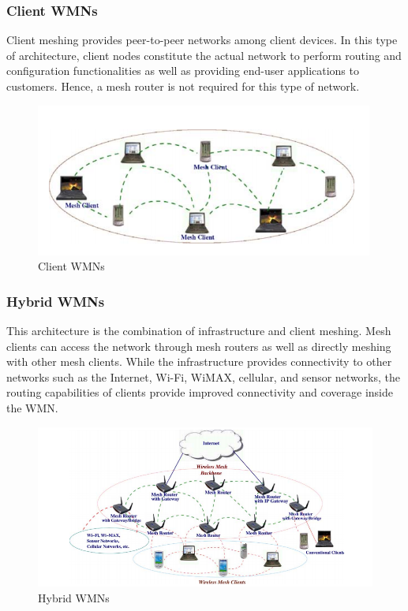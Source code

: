 \documentclass[12pt,a4paper]{report}
\begin{document}
\subsubsection{Client WMNs}
Client meshing provides peer-to-peer networks among client devices.
In this type of architecture, client nodes constitute the actual network to perform
routing and configuration functionalities as well as providing end-user applications to
customers. Hence, a mesh router is not required for this type of network.
\begin{figure}[hbtp]
\centering
\includegraphics[scale=.5]{client-wmn.png}
\caption{Client WMNs}
\end{figure}


\subsubsection{Hybrid WMNs}
This architecture is the combination of infrastructure and client
meshing. Mesh clients can access the network through mesh
routers as well as directly meshing with other mesh clients. While the infrastructure
provides connectivity to other networks such as the Internet, Wi-Fi, WiMAX, cellular,
and sensor networks, the routing capabilities of clients provide improved connectivity
and coverage inside the WMN.
\begin{figure}[hbtp]
\centering
\includegraphics[scale=0.5]{hybrid-wmn.png}
\caption{Hybrid WMNs}
\end{figure}
\end{document}

